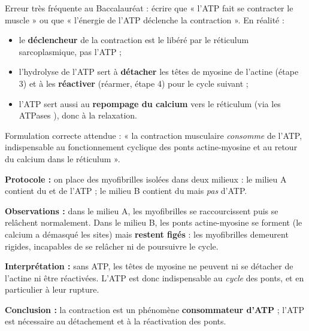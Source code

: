 \documentclass[11pt]{article}
\begin{document}
\begin{attention}
Erreur très fréquente au Baccalauréat : écrire que « l'ATP fait se contracter le muscle » ou que « l'énergie de l'ATP déclenche la contraction ». En réalité :
\begin{itemize}
\item le \textbf{déclencheur} de la contraction est le  libéré par le réticulum sarcoplasmique, pas l'ATP ;
\item l'hydrolyse de l'ATP sert à \textbf{détacher} les têtes de myosine de l'actine (étape 3) et à les \textbf{réactiver} (réarmer, étape 4) pour le cycle suivant ;
\item l'ATP sert aussi au \textbf{repompage du calcium} vers le réticulum (via les ATPases ), donc à la relaxation.
\end{itemize}
Formulation correcte attendue : « la contraction musculaire \emph{consomme} de l'ATP, indispensable au fonctionnement cyclique des ponts actine-myosine et au retour du calcium dans le réticulum ».
\end{attention}

\begin{experience}
\textbf{Protocole :} on place des myofibrilles isolées dans deux milieux : le milieu A contient du  et de l'ATP ; le milieu B contient du  mais \emph{pas} d'ATP.

\textbf{Observations :} dans le milieu A, les myofibrilles se raccourcissent puis se relâchent normalement. Dans le milieu B, les ponts actine-myosine se forment (le calcium a démasqué les sites) mais \textbf{restent figés} : les myofibrilles demeurent rigides, incapables de se relâcher ni de poursuivre le cycle.

\textbf{Interprétation :} sans ATP, les têtes de myosine ne peuvent ni se détacher de l'actine ni être réactivées. L'ATP est donc indispensable au \emph{cycle} des ponts, et en particulier à leur rupture.

\textbf{Conclusion :} la contraction est un phénomène \textbf{consommateur d'ATP} ; l'ATP est nécessaire au détachement et à la réactivation des ponts.
\end{experience}
\end{document}
